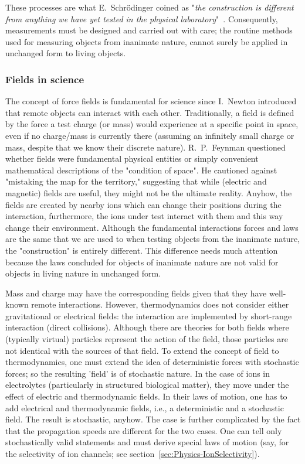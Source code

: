 These processes are what E.~Schrödinger coined as "\textit{the construction is different from anything we have yet tested in the physical laboratory}"~\cite{Schrodinger:1992}. Consequently, measurements must be designed and carried out with care; the routine
methods used for measuring objects from inanimate nature,
cannot surely be applied in unchanged form to living objects.  

\subsubsection[Fields]{Fields in science\label{sec:Physics-Fields}}

The concept of force fields is fundamental for science
since I.~Newton introduced that remote objects can interact with each other. Traditionally, a field is defined by the force a test charge (or mass) would experience at a specific point in space, even if no charge/mass is currently there (assuming an infinitely small charge or mass, despite that we know their discrete nature).
R.~P.~Feynman questioned whether fields were fundamental physical entities or simply convenient mathematical descriptions of the "condition of space".
He cautioned against "mistaking the map for the territory," suggesting that while (electric and magnetic) fields are useful, they might not be the ultimate reality.
Anyhow, the fields are created by nearby ions which 
can change their positions during the interaction,
furthermore, the ions under test interact with them
and this way change their environment.
Although the fundamental interactions forces and laws
are the same that we are used to when testing objects
from the inanimate nature,
the "construction" is entirely different.
This difference needs much attention because 
the laws concluded for objects of inanimate nature
are not valid for objects in living nature in unchanged form.

Mass and charge may have the corresponding fields 
given that they have well-known remote interactions. 
However, thermodynamics does not consider either
gravitational or electrical fields: the interaction 
are implemented by short-range interaction (direct collisions). Although there are
theories for both fields where (typically virtual) particles
represent the action of the field, those particles
are not identical with the sources of that field.
To extend the concept of field to thermodynamics,
one must extend the idea of deterministic forces
with stochastic forces; so the resulting 'field'
is of stochastic nature.
In the case of ions in electrolytes (particularly in
structured biological matter), they move under the effect of
electric and thermodynamic fields.
In their laws of motion, one has to add electrical and thermodynamic fields, i.e., a deterministic and a stochastic field. The result is stochastic, anyhow.
The case is further complicated by the fact that 
the propagation speeds are different for the two cases.
One can tell only stochastically valid statements
and must derive special laws of motion
(say, for the selectivity of ion channels; see section~\ref{sec:Physics-IonSelectivity}).


